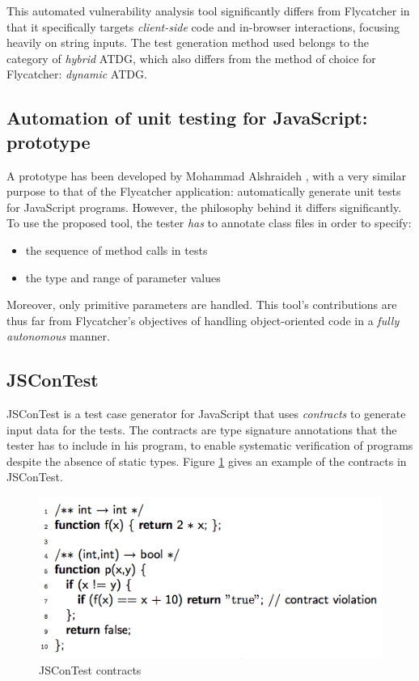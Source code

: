 This automated vulnerability analysis tool significantly differs from \textsf{Flycatcher} in that it specifically targets \emph{client-side} code and in-browser interactions, focusing heavily on string inputs. The test generation method used belongs to the category of \emph{hybrid} ATDG, which also differs from the method of choice for \textsf{Flycatcher}: \emph{dynamic} ATDG.

\subsection{Automation of unit testing for JavaScript: prototype}
A prototype has been developed by Mohammad Alshraideh \cite{alshraideh2008complete}, with a very similar purpose to that of the \textsf{Flycatcher} application: automatically generate unit tests for JavaScript programs. However, the philosophy behind it differs significantly. To use the proposed tool, the tester \emph{has} to annotate class files in order to specify:
\begin{itemize}
   \item the sequence of method calls in tests
   \item the type and range of parameter values
\end{itemize}
Moreover, only primitive parameters are handled. This tool's contributions are thus far from \textsf{Flycatcher}'s objectives of handling object-oriented code in a \emph{fully autonomous} manner.

\subsection{JSConTest}
\textsf{JSConTest} \cite{contract-driven} is a test case generator for JavaScript that uses \emph{contracts} to generate input data for the tests. The contracts are type signature annotations that the tester has to include in his program, to enable systematic verification of programs despite the absence of static types. Figure \ref{contracts} gives an example of the contracts in \textsf{JSConTest}.

\begin{figure}
\centering
\includegraphics[scale=0.5]{./components/chapter2/contracts.png}
\caption{\textsf{JSConTest} contracts}
\label{contracts}
\end{figure}


